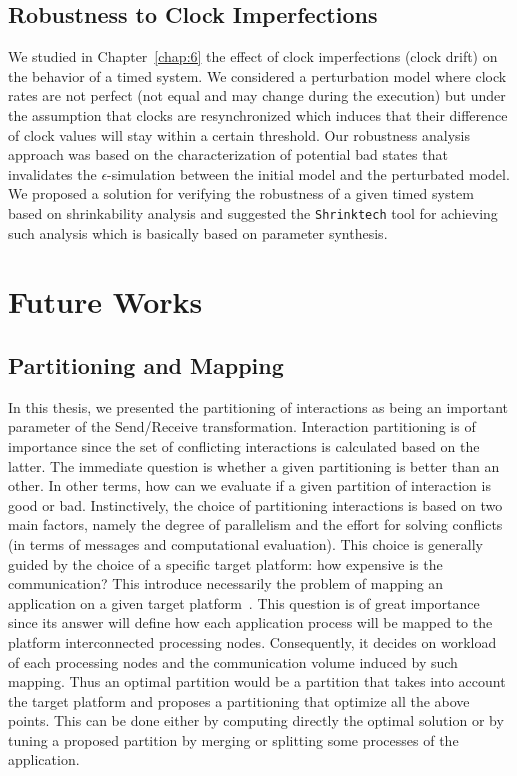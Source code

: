 \subsection*{Robustness to Clock Imperfections}
We studied in Chapter~\ref{chap:6} the effect of clock imperfections (clock drift) on the 
behavior of a timed system. We considered a perturbation model where clock rates are not 
perfect (not equal and may change during the execution) but under the assumption that clocks 
are resynchronized which induces that their difference of clock values will stay within a certain
threshold. 
Our robustness analysis approach was based on the characterization of potential bad states
that invalidates the $\epsilon$-simulation between the initial model and the perturbated model.
We proposed a solution for verifying the robustness of a given timed system based on 
shrinkability analysis and suggested the \texttt{Shrinktech} tool for achieving such analysis
which is basically based on parameter synthesis.


\section{Future Works}
\subsection*{Partitioning and Mapping}

In this thesis, we presented the partitioning of interactions as being an important parameter
of the Send/Receive transformation. Interaction partitioning is of importance since the 
set of conflicting interactions is calculated based on the latter. The immediate question is
whether a given partitioning is better than an other. In other terms, how can we evaluate 
if a given partition of interaction is good or bad. Instinctively, the choice of partitioning
interactions is based on two main factors, namely the degree of parallelism and the effort
for solving conflicts (in terms of messages and computational evaluation).
This choice is generally guided by the choice of a specific target platform: how expensive
is the communication? This introduce necessarily the problem of mapping an application
on a given target platform~\cite{map}. This question is of great importance since its answer
will define how each application process will be mapped to the platform interconnected 
processing nodes. Consequently, it decides on workload of each processing nodes and 
the communication volume induced by such mapping.
Thus an optimal partition would be a partition that takes into account the target platform
and proposes a partitioning that optimize all the above points. This can be done either
by computing directly the optimal solution or by tuning a proposed partition by merging or 
splitting some processes of the application.

